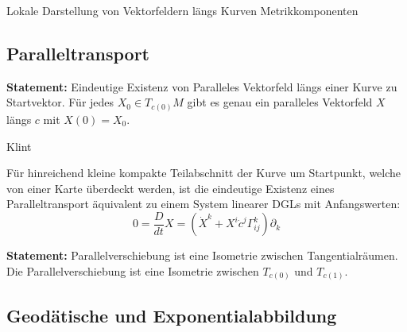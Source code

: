 \documentclass[10pt, letterpaper]{article}
\begin{document}
\StructurePic{}{}
{%
\begin{outline}
  \1 Lokale Darstellung von Vektorfeldern längs Kurven
  \1 Metrikkomponenten 
\end{outline}
}

\vspace{0.5cm}






\pagebreak



\subsection{Paralleltransport}

\textbf{Statement: }{Eindeutige Existenz von Paralleles Vektorfeld längs einer Kurve zu Startvektor}.
Für jedes $X_{0} \in T_{c(0)} M$ gibt es genau ein paralleles Vektorfeld $X$ längs $c$ mit $X(0)=X_{0}$.


{Klint}
{%
\begin{outline}
  Für hinreichend kleine kompakte Teilabschnitt der Kurve um Startpunkt, welche von einer Karte überdeckt werden, ist die eindeutige Existenz eines Paralleltransport äquivalent zu einem System linearer DGLs mit Anfangswerten:
  $$0=\frac{D}{dt}X=(\dot{X}^k+X^i\dot{c}^j\Gamma_{ij}^k)\partial_k$$
\end{outline}
}


\vspace{0.7cm}

\textbf{Statement: }{Parallelverschiebung ist eine Isometrie zwischen Tangentialräumen}.
Die Parallelverschiebung ist eine Isometrie zwischen $T_{c(0)}$ und $T_{c(1)}$.


\vspace{0.8cm}



\pagebreak

\subsection{Geodätische und Exponentialabbildung}
\end{document}
